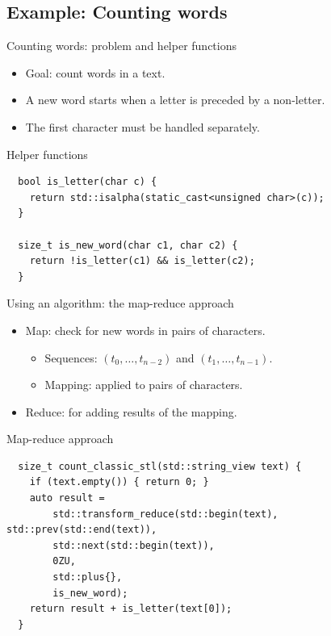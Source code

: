 \subsection{Example: Counting words}

\begin{frame}[t,fragile]{Counting words: problem and helper functions}
    \begin{itemize}
        \item Goal: count words in a text.
        \item A new word starts when a letter is preceded by a non-letter.
        \item The first character must be handled separately.
    \end{itemize}

\begin{block}{Helper functions}
\begin{lstlisting}
  bool is_letter(char c) {
    return std::isalpha(static_cast<unsigned char>(c));
  }

  size_t is_new_word(char c1, char c2) {
    return !is_letter(c1) && is_letter(c2);
  }
\end{lstlisting}
\end{block}
\end{frame}

\begin{frame}[t,fragile]{Using an algorithm: the map-reduce approach}
    \begin{itemize}
        \item Map: check for new words in pairs of characters.
          \begin{itemize}
              \item Sequences: $(t_0, \ldots, t_{n-2})$ and $(t_1, \ldots, t_{n-1})$.
              \item Mapping:  applied to pairs of characters.
          \end{itemize}
        \item Reduce:  for adding results of the mapping.
    \end{itemize}

\begin{block}{Map-reduce approach}
\begin{lstlisting}
  size_t count_classic_stl(std::string_view text) {
    if (text.empty()) { return 0; }
    auto result =
        std::transform_reduce(std::begin(text), std::prev(std::end(text)), 
        std::next(std::begin(text)), 
        0ZU,
        std::plus{}, 
        is_new_word);
    return result + is_letter(text[0]);
  }
\end{lstlisting}
\end{block}
\end{frame}

